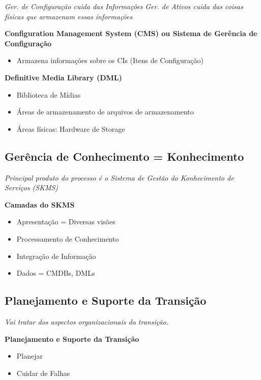 \begin{center}
	\emph{Ger. de Configuração cuida das Informações}
	\emph{Ger. de Ativos cuida das coisas físicas que armazenam essas informações}
\end{center}


\textbf{Configuration Management System (CMS) ou Sistema de Gerência de Configuração}
\begin{itemize}
	\item Armazena informações sobre os CIs (Itens de Configuração)
\end{itemize}

\textbf{Definitive Media Library (DML)}
\begin{itemize}
	\item Biblioteca de Mídias
	\item Áreas de armazenamento de arquivos de armazenamento
	\item Áreas físicas: Hardware de Storage
\end{itemize}


\subsection{Gerência de Conhecimento = Konhecimento}

\begin{center}
	\emph{Principal produto do processo é o Sistema de Gestão do Konhecimento de Serviços (SKMS)}
\end{center}

\textbf{Camadas do SKMS}
\begin{itemize}
	\item Apresentação = Diversas visões
	\item Processamento de Conhecimento
	\item Integração de Informação
	\item Dados = CMDBs, DMLs
\end{itemize}


\subsection{Planejamento e Suporte da Transição}

\begin{center}
	\emph{Vai tratar dos aspectos organizacionais da transição.}
\end{center}


\textbf{Planejamento e Suporte da Transição}
\begin{itemize}
	\item Planejar
	\item Cuidar de Falhas
\end{itemize}

